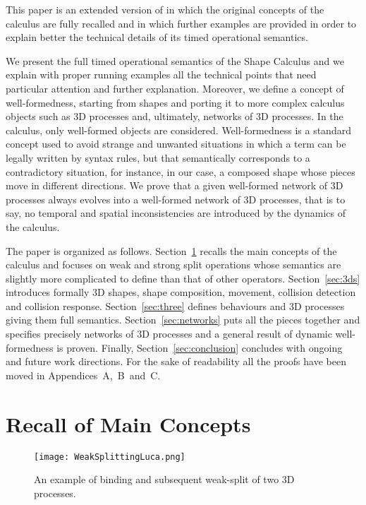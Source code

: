 \documentclass[11pt]{article}
\begin{document}
This paper is an extended version of \cite{Bartocci2010b} in which the original concepts of the calculus are fully recalled and in which further examples are provided in order to explain better the technical details of its timed operational semantics. 

We present the full timed operational semantics of the Shape Calculus and we explain with proper running examples all the technical points that need particular attention and further explanation. Moreover, we define a concept of well-formedness, starting from shapes and porting it to more complex calculus objects such as 3D processes and, ultimately, networks of 3D processes. In the calculus, only well-formed objects are considered. Well-formedness is a standard concept used to avoid strange and unwanted situations in which a term can be legally written by syntax rules, but that semantically corresponds to a contradictory situation, for instance, in our case, a composed shape whose pieces move in different directions. We prove that a given well-formed network of 3D processes always evolves into a well-formed network of 3D processes, that is to say, no temporal and spatial inconsistencies are introduced by the dynamics of the calculus.

The paper is organized as follows. Section~\ref{sec:overview} recalls the main concepts of the calculus and focuses on weak and strong split operations whose semantics are slightly more complicated to define than that of other operators. Section~\ref{sec:3ds} introduces formally 3D shapes, shape composition, movement, collision detection and collision response. Section~\ref{sec:three} defines behaviours and 3D processes giving them full semantics. Section~\ref{sec:networks} puts all the pieces together and specifies precisely networks of 3D processes and a general result of dynamic well-formedness is proven. Finally, Section~\ref{sec:conclusion} concludes with ongoing and future work directions. For the sake of readability all the proofs have been moved in Appendices~A,~B~and~C.

\section{Recall of Main Concepts}
\label{sec:overview}

\begin{figure}[t]
\begin{center}
\texttt{[image: WeakSplittingLuca.png]}
\end{center}
\caption{An example of binding and subsequent weak-split of two 3D processes.}
\label{fig:WeakSplitting}
\end{figure}
\end{document}
